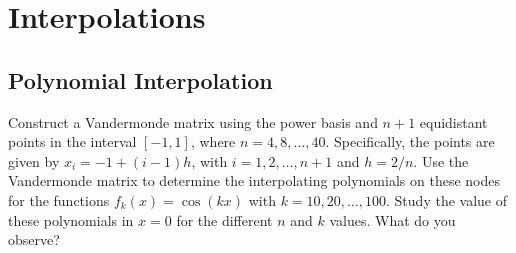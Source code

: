\section{Interpolations}

\subsection{Polynomial Interpolation}

\begin{exercise}
	Construct a Vandermonde matrix using the power basis and $n+1$ equidistant
	points in the interval $[-1,1]$, where $n=4,8,\ldots,40$.
	Specifically, the points are given by $x_i=-1+(i-1)h$, with $i=1,2,\ldots,n+1$
	and $h=2/n$. Use the Vandermonde matrix to determine the interpolating
	polynomials on these nodes for the functions $f_k(x)=\cos(kx)$ with
	$k=10,20,\ldots,100$. Study the value of these polynomials in $x=0$ for the
	different $n$ and $k$ values. What do you observe?
\end{exercise}

